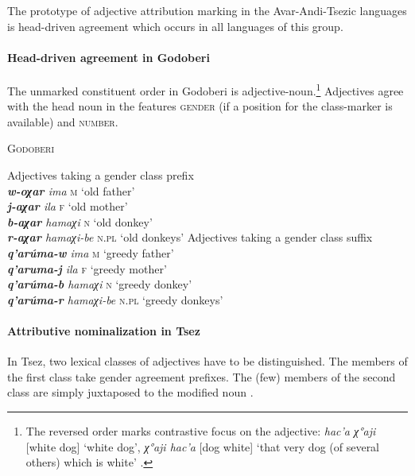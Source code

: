 \noindent The prototype of adjective attribution marking in the Avar-Andi-Tsezic languages is head-driven agreement which occurs in all languages of this group.

\paragraph{Head-driven agreement in Godoberi}
The unmarked constituent order in Godoberi is adjective-noun.\footnote{The reversed order marks contrastive focus on the adjective: \textit{hac'a χ°aji} [white dog] ‘white dog’, \textit{χ°aji hac'a} [dog white] ‘that very dog (of several others) which is white’ \citep[149]{kazenin1996a}.} Adjectives agree with the head noun in the features \textsc{gender} (if a position for the class-marker is available) and \textsc{number}.
\begin{exe}
\ex \textsc{Godoberi} \cite[25]{tatevosov1996a}
\begin{xlist}
\ex Adjectives taking a gender class prefix\\
\textit{\textbf{w-oχar} ima} \textsc{m} ‘old father’\\
\textit{\textbf{j-aχar} ila} \textsc{f} ‘old mother’\\
\textit{\textbf{b-aχar} hamaχi} \textsc{n} ‘old donkey’\\
\textit{\textbf{r-aχar} hamaχi-be} \textsc{n.pl} ‘old donkeys’
\ex Adjectives taking a gender class suffix\\
\textit{\textbf{q'arúma-w} ima} \textsc{m} ‘greedy father’\\
\textit{\textbf{q'aruma-j} ila} \textsc{f} ‘greedy mother’\\
\textit{\textbf{q'arúma-b} hamaχi} \textsc{n} ‘greedy donkey’\\
\textit{\textbf{q'arúma-r} hamaχi-be} \textsc{n.pl} ‘greedy donkeys’
\end{xlist}
\end{exe}
\paragraph{Attributive nominalization in Tsez}
In Tsez, two lexical classes of adjectives have to be distinguished. The members of the first class take gender agreement prefixes. The (few) members of the second class are simply juxtaposed to the modified noun \cite[126]{alekseev-etal2004}.

